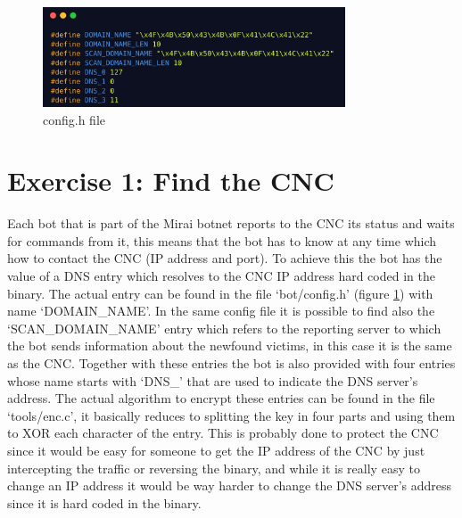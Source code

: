 \begin{figure}
    \centering
    \includegraphics[width=0.8\textwidth]{resources/images/config.png}
    \caption{config.h file}
    \label{fig:config_h}
\end{figure}
\section{Exercise 1: Find the CNC}
Each bot that is part of the Mirai botnet reports to the CNC its status and waits for commands from it, this means that the bot has to know at any time which how to contact the CNC (IP address and port). To achieve this the bot has the value of a DNS entry which resolves to the CNC IP address hard coded in the binary. The actual entry can be found in the file `bot/config.h' (figure \ref{fig:config_h}) with name `DOMAIN\_NAME'. In the same config file it is possible to find also the `SCAN\_DOMAIN\_NAME' entry which refers to the reporting server to which the bot sends information about the newfound victims, in this case it is the same as the CNC. Together with these entries the bot is also provided with four entries whose name starts with `DNS\_' that are used to indicate the DNS server's address. The actual algorithm to encrypt these entries can be found in the file `tools/enc.c', it basically reduces to splitting the key in four parts and using them to XOR each character of the entry. This is probably done to protect the CNC since it would be easy for someone to get the IP address of the CNC by just intercepting the traffic or reversing the binary, and while it is really easy to change an IP address it would be way harder to change the DNS server's address since it is hard coded in the binary.

